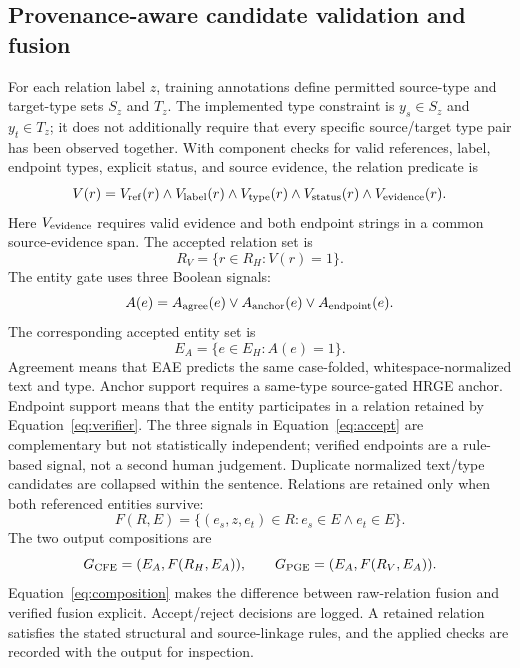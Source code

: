 \documentclass[a4paper,fleqn,numbers,doubleblind]{cas-dc}
\begin{document}
\subsection{Provenance-aware candidate validation and fusion}
For each relation label $z$, training annotations define permitted source-type
and target-type sets $S_z$ and $T_z$. The implemented type constraint is
$y_s\in S_z$ and $y_t\in T_z$; it does not additionally require that every
specific source/target type pair has been observed together. With component
checks for valid references, label, endpoint types, explicit status, and source
evidence, the relation predicate is
\begin{equation}
V(r)=V_{\rm ref}(r)\land V_{\rm label}(r)\land V_{\rm type}(r)
\land V_{\rm status}(r)\land V_{\rm evidence}(r).
\label{eq:verifier-predicate}
\end{equation}
Here $V_{\rm evidence}$ requires valid evidence and both endpoint strings in a
common source-evidence span. The accepted relation set is
\begin{equation}
R_V=\{r\in R_H:V(r)=1\}.
\label{eq:verifier}
\end{equation}
The entity gate uses three Boolean signals:
\begin{equation}
 A(e)=A_{\rm agree}(e)\lor A_{\rm anchor}(e)\lor A_{\rm endpoint}(e).
\label{eq:accept}
\end{equation}
The corresponding accepted entity set is
\begin{equation}
E_A=\{e\in E_H:A(e)=1\}.
\label{eq:accepted-entities}
\end{equation}
Agreement means that EAE predicts the same case-folded, whitespace-normalized
text and type. Anchor support requires a same-type source-gated HRGE anchor.
Endpoint support means that the entity participates in a relation retained by
Equation~\eqref{eq:verifier}. The three signals in Equation~\eqref{eq:accept}
are complementary but not statistically independent; verified endpoints are
a rule-based signal, not a second human judgement. Duplicate normalized
text/type candidates are collapsed within the sentence. Relations are retained
only when both referenced entities survive:
\begin{equation}
F(R,E)=\{(e_s,z,e_t)\in R:e_s\in E\land e_t\in E\}.
\label{eq:endpoint-filter}
\end{equation}
The two output compositions are
\begin{equation}
G_{\rm CFE}=(E_A,F(R_H,E_A)),\qquad
G_{\rm PGE}=(E_A,F(R_V,E_A)).
\label{eq:composition}
\end{equation}
Equation~\eqref{eq:composition} makes the difference between raw-relation
fusion and verified fusion explicit. Accept/reject decisions are logged. A
retained relation satisfies the stated structural and source-linkage rules, and
the applied checks are recorded with the output for inspection.
\end{document}
